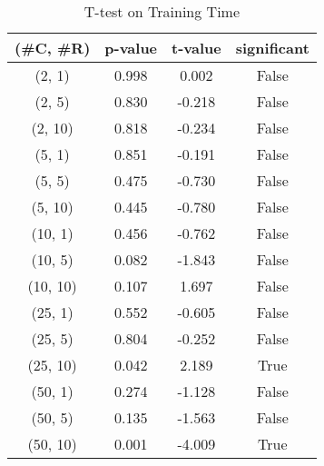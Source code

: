 \begin{table}[h]
\centering
\caption{T-test on Training Time}
\label{tab:t-testTraining}
\begin{tabular}{|c|c|c|c|}
\toprule
(\#C, \#R) &  p-value &  t-value &  significant \\
\midrule
  (2, 1) &    0.998 &    0.002 &        False \\
  (2, 5) &    0.830 &   -0.218 &        False \\
 (2, 10) &    0.818 &   -0.234 &        False \\
  (5, 1) &    0.851 &   -0.191 &        False \\
  (5, 5) &    0.475 &   -0.730 &        False \\
 (5, 10) &    0.445 &   -0.780 &        False \\
 (10, 1) &    0.456 &   -0.762 &        False \\
 (10, 5) &    0.082 &   -1.843 &        False \\
(10, 10) &    0.107 &    1.697 &        False \\
 (25, 1) &    0.552 &   -0.605 &        False \\
 (25, 5) &    0.804 &   -0.252 &        False \\
(25, 10) &    0.042 &    2.189 &         True \\
 (50, 1) &    0.274 &   -1.128 &        False \\
 (50, 5) &    0.135 &   -1.563 &        False \\
(50, 10) &    0.001 &   -4.009 &         True \\
\bottomrule
\end{tabular}
\end{table}
